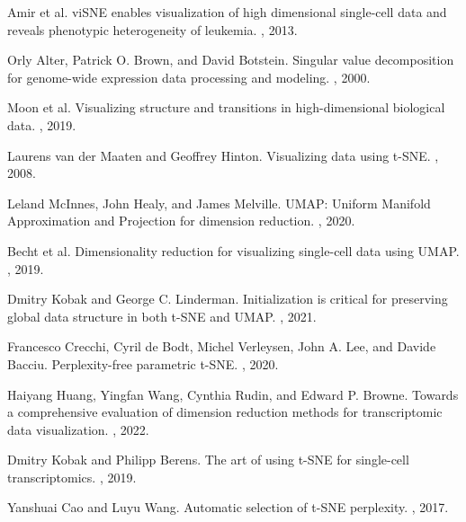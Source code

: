 \documentclass{article}
\begin{document}
\begin{thebibliography}{10}

Amir et al.
\newblock viSNE enables visualization of high dimensional single-cell data and reveals phenotypic heterogeneity of leukemia.
, 2013.

Orly Alter, Patrick O. Brown, and David Botstein.
\newblock Singular value decomposition for genome-wide expression data processing and modeling.
, 2000.

Moon et al.
\newblock Visualizing structure and transitions in high-dimensional biological data.
, 2019.

Laurens van der Maaten and Geoffrey Hinton.
\newblock Visualizing data using t-SNE.
, 2008.

Leland McInnes, John Healy, and James Melville.
\newblock UMAP: Uniform Manifold Approximation and Projection for dimension reduction.
, 2020.

Becht et al.
\newblock Dimensionality reduction for visualizing single-cell data using UMAP.
, 2019.

Dmitry Kobak and George C. Linderman.
\newblock Initialization is critical for preserving global data structure in both t-SNE and UMAP.
, 2021.

Francesco Crecchi, Cyril de Bodt, Michel Verleysen, John A. Lee, and Davide Bacciu.
\newblock Perplexity-free parametric t-SNE.
, 2020.

Haiyang Huang, Yingfan Wang, Cynthia Rudin, and Edward P. Browne.
\newblock Towards a comprehensive evaluation of dimension reduction methods for transcriptomic data visualization.
, 2022.

Dmitry Kobak and Philipp Berens.
\newblock The art of using t-SNE for single-cell transcriptomics.
, 2019.

Yanshuai Cao and Luyu Wang. 
\newblock Automatic selection of t-SNE perplexity.
, 2017.


\end{thebibliography}
\end{document}
